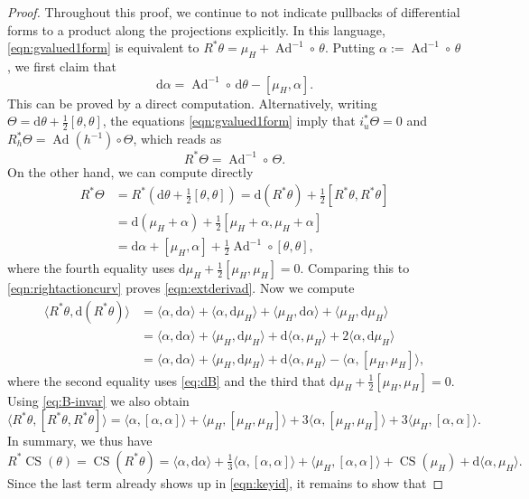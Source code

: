 \documentclass[british,11pt,a4paper]{amsart}
\numberwithin{equation}{section}
\newcommand{\deq}{:=}
\newcommand{\B}[2]{\langle#1,#2\rangle}
\newcommand{\CS}{\operatorname{CS}}
\newcommand{\Ad}{\operatorname{Ad}}
\renewcommand*{\d}{\mathrm{d}}
\numberwithin{theorem}{section}
\theoremstyle{definition}
\theoremstyle{remark}
\begin{document}
  \begin{proof}
  Throughout this proof, we continue to not indicate pullbacks of differential forms
  to a product along the projections explicitly. In this language,
  \eqref{eqn:gvalued1form} is equivalent to
  $R^*\theta=\mu_H+\Ad^{-1}\circ\,\theta$. Putting $\alpha\deq\Ad^{-1}\circ\,\theta$,
  we first claim that
  \begin{equation}\label{eqn:extderivad}
  \d\alpha=\Ad^{-1}\circ\,\d\theta-[\mu_H,\alpha].
  \end{equation}
  This can be proved by a direct computation. Alternatively, writing
  $\Theta=\d\theta+\frac{1}{2}[\theta,\theta]$, the equations
  \eqref{eqn:gvalued1form} imply that $i_u^*\Theta=0$ and
  $R_h^*\Theta=\Ad(h^{-1})\circ\Theta$, which reads as
  \begin{equation}\label{eqn:rightactioncurv}
  R^*\Theta=\Ad^{-1}\circ\,\Theta.
  \end{equation}
  On the other hand, we can compute directly
  \[
  \begin{aligned}
  R^*\Theta&=R^*\left(\d\theta+\tfrac{1}{2}[\theta,\theta]\right)=\d(R^*\theta)+\tfrac{1}{2}[R^*\theta,R^*\theta]\\
  &=\d(\mu_H+\alpha)+\tfrac{1}{2}[\mu_H+\alpha,\mu_H+\alpha]\\
  &=\d\alpha+[\mu_H,\alpha]+\tfrac{1}{2}\Ad^{-1}\circ [\theta,\theta],
\end{aligned}
\]
where the fourth equality uses $\d\mu_H+\frac{1}{2}[\mu_H,\mu_H]=0$. 
Comparing this to \eqref{eqn:rightactioncurv} proves \eqref{eqn:extderivad}.
Now we compute
\[
\begin{aligned}
\B{R^*\theta}{\d(R^*\theta)}&=\B{\alpha}{\d\alpha}+\B{\alpha}{\d\mu_H}+\B{\mu_H}{\d \alpha}+\B{\mu_H}{\d \mu_H}\\
&=\B{\alpha}{\d\alpha}+\B{\mu_H}{\d \mu_H}+\d\B{\alpha}{\mu_H}+2\B{\alpha}{\d\mu_H}\\
&=\B{\alpha}{\d\alpha}+\B{\mu_H}{\d \mu_H}+\d\B{\alpha}{\mu_H}-\B{\alpha}{[\mu_H,\mu_H]},
\end{aligned}
\]
where the second equality uses \eqref{eq:dB} and the third that $\d\mu_H+\frac{1}{2}[\mu_H,\mu_H]=0$. Using \eqref{eq:B-invar} we also obtain
\[
\B{R^*\theta}{[R^*\theta,R^*\theta]}=\B{\alpha}{[\alpha,\alpha]}+\B{\mu_H}{[\mu_H,\mu_H]}+3\B{\alpha}{[\mu_H,\mu_H]}+3\B{\mu_H}{[\alpha,\alpha]}.
\]
In summary, we thus have
\[
R^*\CS(\theta)=\CS(R^*\theta)=\B{\alpha}{\d\alpha}+\tfrac{1}{3}\B{\alpha}{[\alpha,\alpha]}+
\B{\mu_H}{[\alpha,\alpha]}+\CS(\mu_H)+\d\B{\alpha}{\mu_H}. 
\]
Since the last term already shows up in \eqref{eqn:keyid}, it remains to show that 

\end{proof}
\end{document}
